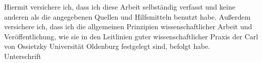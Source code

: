
Hiermit versichere ich, dass ich diese Arbeit selbständig verfasst und keine
anderen als die angegebenen Quellen und Hilfsmitteln benutzt habe. Außerdem
versichere ich, dass ich die allgemeinen Prinzipien wissenschaftlicher Arbeit
und Veröffentlichung, wie sie in den Leitlinien guter wissenschaftlicher Praxis
der Carl von Ossietzky Universität Oldenburg festgelegt sind, befolgt
habe.\\[0.75em]


Unterschrift
